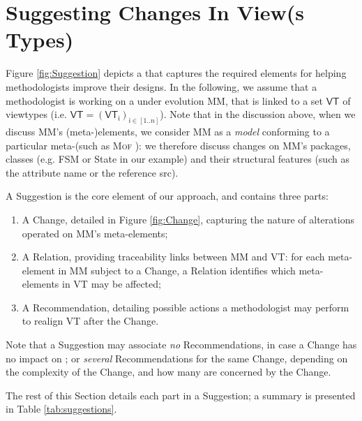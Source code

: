 \section{Suggesting Changes In View(s Types)}
\label{sec:Suggestion}


Figure \ref{fig:Suggestion} depicts a \metamodel that captures the
required elements for helping methodologists improve their designs.
In the following, we assume that a methodologist is working on a \metamodel
under evolution \textsf{MM}, that is linked to a set $\mathsf{VT}$ of viewtypes
(i.e. $\mathsf{VT} = (\mathsf{VT}_\mathsf{i})_{\mathsf{i}\in [1..n]}$). Note that in the discussion above, when we discuss
\textsf{MM}'s (meta-)elements, we consider \textsf{MM} as a \emph{model}
conforming to a particular meta-\metamodel (such as \textsc{Mof} \cite{TR:OMG-MOF:2016}):
we therefore discuss changes on \textsf{MM}'s packages, classes (e.g. 
\textsf{FSM} or \textsf{State} in our example) and their structural features
(such as the attribute \textsf{name} or the reference \textsf{src}).

A \textsf{Suggestion} is the core element of our approach, and contains three 
parts:
\begin{enumerate}
    \item A \textsf{Change}, detailed in Figure \ref{fig:Change}, capturing the nature of
alterations operated on \textsf{MM}'s meta-elements; 
    \item A \textsf{Relation}, providing traceability links between \textsf{MM} and \textsf{VT}: for each meta-element in \textsf{MM} subject to a \textsf{Change}, a \textsf{Relation}
identifies which meta-elements in \textsf{VT} may be affected;
    \item A \textsf{Recommendation}, detailing possible actions a methodologist may perform to realign \textsf{VT} after the \textsf{Change}. 
\end{enumerate}

Note that a \textsf{Suggestion} may 
associate \emph{no} \textsf{Recommendation}s, in case a \textsf{Change} has no
impact on \viewtypes; or \emph{several} \textsf{Recommendation}s for the same 
\textsf{Change}, depending on the complexity of the \textsf{Change}, and how 
many \viewtypes are concerned by the \textsf{Change}.

The rest of this Section details each part in a \textsf{Suggestion}; a summary
is presented in Table \ref{tab:suggestions}.






